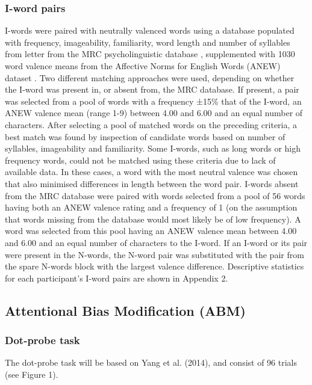 \documentclass[man,a4paper,biblatex]{apa6}
\newcounter{Figure}
\begin{document}
\subsubsection{I-word pairs}

I-words were paired with neutrally valenced words using a database
populated with frequency, imageability, familiarity, word length
and number of syllables from letter from the MRC psycholinguistic
database \parencite{wilson_mrc_1988}, supplemented with 1030 word
valence means from the Affective Norms for English Words (ANEW) dataset
\parencite{bradley_affective_1999}.  Two different matching approaches
were used, depending on whether the I-word was present in, or absent
from, the MRC database.  If present, a pair was selected from a pool of
words with a frequency ±15\% that of the I-word, an ANEW valence mean
(range 1-9) between 4.00 and 6.00 and an equal number of characters.
After selecting a pool of matched words on the preceding criteria, a
best match was found by inspection of candidate words based on number
of syllables, imageability and familiarity.  Some I-words, such as long
words or high frequency words, could not be matched using these criteria
due to lack of available data.  In these cases, a word with the most
neutral valence was chosen that also minimised differences in length
between the word pair.  I-words absent from the MRC database were paired
with words selected from a pool of 56 words having both an ANEW valence
rating and a frequency of 1 (on the assumption that words missing from
the database would most likely be of low frequency).  A word was selected
from this pool having an ANEW valence mean between 4.00 and 6.00 and
an equal number of characters to the I-word.  If an I-word or its pair
were present in the N-words, the N-word pair was substituted with the
pair from the spare N-words block with the largest valence difference.
Descriptive statistics for each participant's I-word pairs are shown in
Appendix 2.

\subsection{Attentional Bias Modification (ABM)}

\subsubsection{Dot-probe task}
The dot-probe task will be based on Yang et al. (2014), and consist of 96 trials (see Figure 1).
\end{document}
